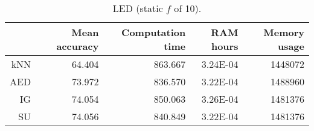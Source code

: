 \begin{table}[h]
\centering
\begin{tabular}{r|rrrr}	
    & Mean accuracy & Computation time & RAM hours & Memory usage \\ \hline
kNN & 64.404                   & 863.667          & 3.24E-04  & 1448072      \\
AED & 73.972                   & 836.570          & 3.22E-04  & 1488960      \\
IG  & 74.054                   & 850.063          & 3.26E-04  & 1481376      \\
SU  & 74.056                   & 840.849          & 3.22E-04  & 1481376     
\end{tabular}
\caption{LED (static $f$ of 10).}
\label{Table:LED10}
\end{table}